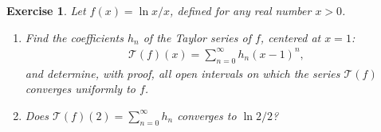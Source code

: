 \documentclass[11pt]{article}
\newtheorem{exercise}{Exercise}[section]
\theoremstyle{definition}
\numberwithin{equation}{subsection}
\begin{document}
\begin{exercise}{\rm *}
Let $  f(x) = \ln x / x$, defined for any real number $x > 0$.
\begin{enumerate}[label=(\alph*)]
    \item Find the coefficients $h_n$ of the Taylor series of $f$, centered at $x = 1$:
    \begin{align*}
        \mathcal{T}(f)(x) = \sum^\infty_{n = 0} h_n (x - 1)^n,
    \end{align*}
    and determine, with proof, all open intervals on which the series $\mathcal{T}(f)$ converges uniformly to $f$.
    
    \item Does $  \mathcal{T}(f)(2) = \sum^\infty_{n = 0} h_n$ converges to $\ln 2 / 2$?
\end{enumerate}
\end{exercise}
\end{document}
